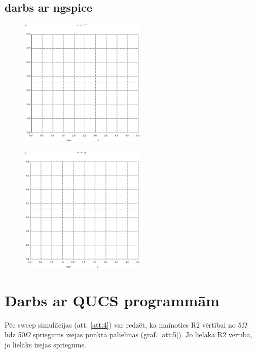 \documentclass{report}
\begin{document}
\subsection{darbs ar ngspice}

\begin{figure}[b!]
\centering
\begin{minipage}{.5\textwidth}
\centering
\includegraphics[width=6cm]{02.ps}
\label{att:2}
\end{minipage}

\begin{minipage}{.5\textwidth}
\centering
\includegraphics[width=6cm]{01.ps}
\label{att:3}
\end{minipage}
\end{figure}

\newpage
\section{Darbs ar QUCS programmām}
Pēc sweep simulācijas (att. \ref{att:4}) var redzēt, ka mainoties R2 vērtībai no 5$ \Omega$ līdz 50$ \Omega$ spriegums izejas punktā palielinās (graf. \ref{att:5}). Jo lielāka R2 vērtība, jo lielāks izejas spriegums.
\end{document}
